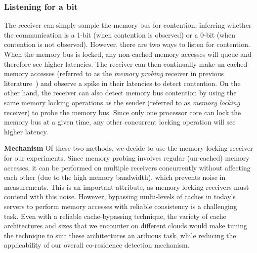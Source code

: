 \subsubsection{Listening for a bit}
The receiver can simply sample the memory bus for contention, inferring whether
the communication is a 1-bit (when contention is observed) or a 0-bit (when
contention is not observed). However, there are two ways to listen for
contention.  When the memory bus is locked, any non-cached memory accesses will
queue and therefore see higher latencies.  The receiver can then continually
make un-cached memory accesses (referred to as the \textit{memory probing}
receiver in previous literature~\cite{varadarajan2015}) and observe a spike in
their latencies to detect contention. On the other hand, the receiver can also
detect memory bus contention by using the same memory locking operations as the
sender (referred to as \textit{memory locking} receiver) to probe the memory
bus. Since only one processor core can lock the memory bus at a given time, any
other concurrent locking operation will see higher latency. 

\textbf{Mechanism} 
Of these two methods, we decide to use the memory locking receiver for our
experiments.  
Since memory probing involves regular (un-cached) memory accesses, it can be
performed on multiple receivers concurrently without affecting each other (due
to the high memory bandwidth), which prevents noise in measurements. This is an
important attribute, as memory locking receivers must contend with this noise.
However, bypassing multi-levels of caches in today's servers to perform memory
accesses with reliable consistency is a challenging task. Even with a reliable
cache-bypassing technique, the variety of cache architectures and sizes that we
encounter on different clouds would make tuning the technique to suit these
architectures an arduous task, while reducing the applicability of our overall
co-residence detection mechanism. 



